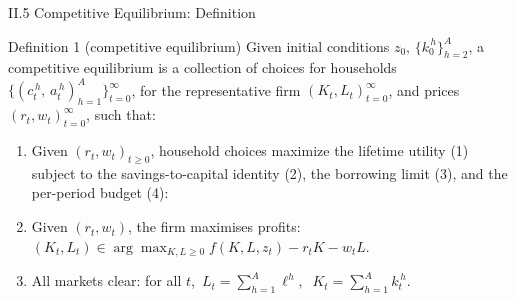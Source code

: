 \documentclass[aspectratio=169,11pt]{beamer}
\newcommand{\emphc}[1]{\textcolor{harvardcrimson}{#1}}
\begin{document}
\begin{frame}{II.5 Competitive Equilibrium: Definition}
\footnotesize
\begin{block}{Definition 1 (competitive equilibrium)}
\vspace{-2pt}
Given initial conditions $z_0,\,\{k_0^{\,h}\}_{h=2}^{A}$, a competitive equilibrium is a collection of choices for households $\bigl\{(c_t^{\,h},\,a_t^{\,h})_{h=1}^{A}\bigr\}_{t=0}^{\infty}$, for the representative firm $(K_t, L_t)_{t=0}^{\infty}$, and prices $(r_t, w_t)_{t=0}^{\infty}$, such that:
\begin{enumerate}\itemsep1pt
    \item Given $(r_t, w_t)_{t\ge 0}$, household choices maximize the lifetime utility (1) subject to the savings-to-capital identity (2), the borrowing limit (3), and the per-period budget (4):\\[1pt]
    \mbox{}
    \item Given $(r_t, w_t)$, the firm maximises profits:\\[1pt]
    \mbox{}\hspace{1em}$(K_t, L_t) \in \arg\max_{K, L \ge 0} f(K, L, z_t) - r_t K - w_t L$.
    \item \emphc{All markets clear:} for all $t$,\;\, $L_t = \sum_{h=1}^A \ell^h, \;\; K_t = \sum_{h=1}^A k_t^{\,h}.$
\end{enumerate}
\vspace{-2pt}
\end{block}
\end{frame}
\end{document}
